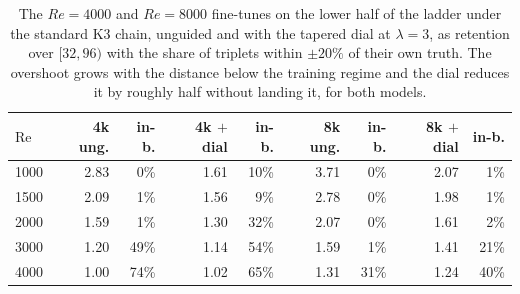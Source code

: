 \begin{table}[t]
  \centering
  \caption{The $Re{=}4000$ and $Re{=}8000$ fine-tunes on the lower half of the ladder under the standard K3 chain, unguided and with the tapered dial at $\lambda=3$, as retention over $[32,96)$ with the share of triplets within $\pm20\%$ of their own truth. The overshoot grows with the distance below the training regime and the dial reduces it by roughly half without landing it, for both models.}
  \label{tab:downward-4k8k}
  \begin{tabular}{lrrrrrrrr}
    \toprule
    $\mathrm{Re}$ & 4k ung. & in-b. & 4k $+$dial & in-b. & 8k ung. & in-b. & 8k $+$dial & in-b. \\
    \midrule
    1000 & 2.83 & 0\% & 1.61 & 10\% & 3.71 & 0\% & 2.07 & 1\% \\
    1500 & 2.09 & 1\% & 1.56 & 9\% & 2.78 & 0\% & 1.98 & 1\% \\
    2000 & 1.59 & 1\% & 1.30 & 32\% & 2.07 & 0\% & 1.61 & 2\% \\
    3000 & 1.20 & 49\% & 1.14 & 54\% & 1.59 & 1\% & 1.41 & 21\% \\
    4000 & 1.00 & 74\% & 1.02 & 65\% & 1.31 & 31\% & 1.24 & 40\% \\
    \bottomrule
  \end{tabular}
\end{table}
